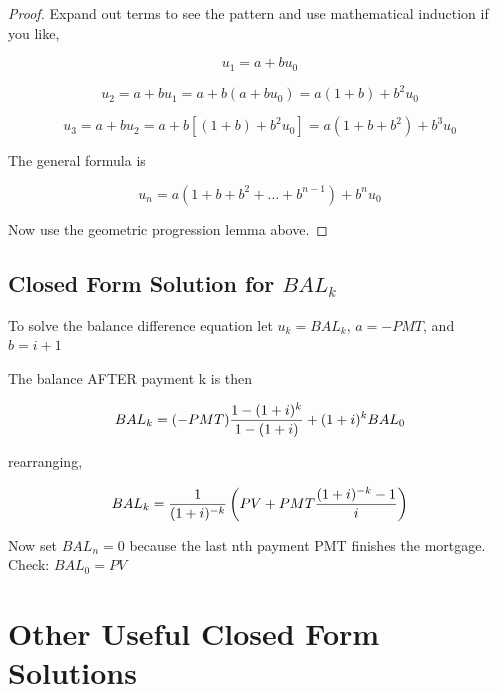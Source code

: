 \documentclass{article}
\theoremstyle{definition} %
\theoremstyle{definition} %
\theoremstyle{remark} %
\begin{document}
\begin{proof}   Expand out terms to see the pattern and use mathematical induction if you like,

\begin{equation}
u_1 = a  + b u_0
\end{equation}

\begin{equation}
u_2 = a  + b u_1 = a + b(a + b u_0) = a (1 +  b) + b^2 u_0
\end{equation}

\begin{equation}
u_3 = a  + b u_2 = a + b [ (1+b) + b^2 u_0] = a (1 +  b + b^2) + b^3 u_0
\end{equation}

The general formula is

\begin{equation}
u_n = a (1 +  b + b^2 + \ldots + b^{n-1}) + b^n u_0
\end{equation}

Now use the geometric progression lemma above.

\end{proof}

\subsection{Closed Form Solution for $BAL_k$}

To solve the balance difference equation let $u_k = BAL_k$, $a = -PMT$, and $b = i+1$

The balance AFTER payment k is then

\begin{equation}
BAL_k = {(-PMT) {1 - (1+i)^k \over 1 - (1+i) } + (1+i)^k BAL_0}
\end{equation}

rearranging,

\begin{equation}
BAL_k =  {1 \over  (1+i)^{-k} }   \left(  PV + PMT  { (1+i)^{-k} -1 \over i }   \right)
\end{equation}

Now set $BAL_n = 0$ because the last nth payment PMT finishes the mortgage.
Check:  $BAL_0 = PV$

\pagebreak 

\section{Other Useful Closed Form Solutions}
\end{document}
